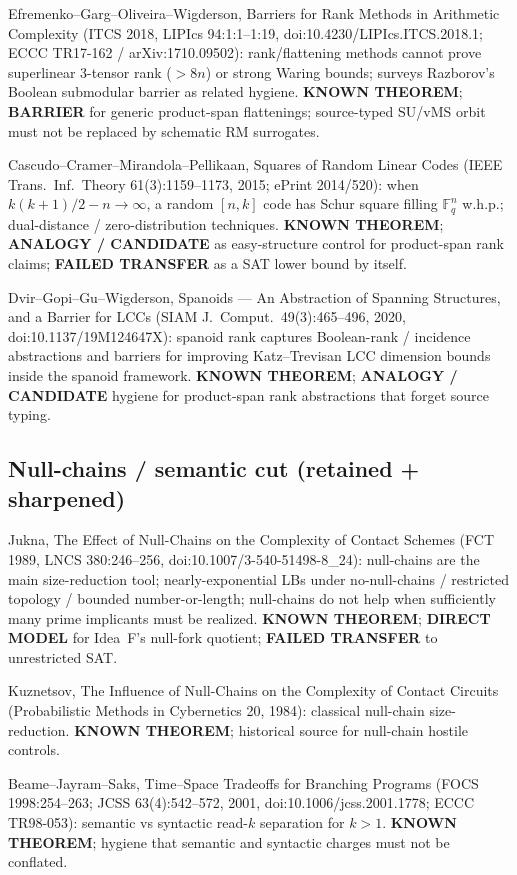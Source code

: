 \documentclass[11pt]{article}
\begin{document}
Efremenko--Garg--Oliveira--Wigderson, Barriers for Rank Methods in Arithmetic Complexity
(ITCS 2018, LIPIcs 94:1:1--1:19, doi:10.4230/LIPIcs.ITCS.2018.1; ECCC TR17-162 / arXiv:1710.09502):
rank/flattening methods cannot prove superlinear 3-tensor rank ($>8n$) or strong Waring
bounds; surveys Razborov's Boolean submodular barrier as related hygiene.
\textbf{KNOWN THEOREM}; \textbf{BARRIER} for generic product-span flattenings;
source-typed SU/vMS orbit must not be replaced by schematic RM surrogates.

Cascudo--Cramer--Mirandola--Pellikaan, Squares of Random Linear Codes
(IEEE Trans.\ Inf.\ Theory 61(3):1159--1173, 2015; ePrint 2014/520):
when $k(k+1)/2-n\to\infty$, a random $[n,k]$ code has Schur square filling $\mathbb F_q^n$
w.h.p.; dual-distance / zero-distribution techniques.
\textbf{KNOWN THEOREM}; \textbf{ANALOGY / CANDIDATE} as easy-structure control for
product-span rank claims; \textbf{FAILED TRANSFER} as a SAT lower bound by itself.

Dvir--Gopi--Gu--Wigderson, Spanoids --- An Abstraction of Spanning Structures, and a Barrier for LCCs
(SIAM J.\ Comput.\ 49(3):465--496, 2020, doi:10.1137/19M124647X):
spanoid rank captures Boolean-rank / incidence abstractions and barriers for improving
Katz--Trevisan LCC dimension bounds inside the spanoid framework.
\textbf{KNOWN THEOREM}; \textbf{ANALOGY / CANDIDATE} hygiene for product-span rank
abstractions that forget source typing.

\subsection*{Null-chains / semantic cut (retained + sharpened)}
Jukna, The Effect of Null-Chains on the Complexity of Contact Schemes
(FCT 1989, LNCS 380:246--256, doi:10.1007/3-540-51498-8\_24):
null-chains are the main size-reduction tool; nearly-exponential LBs under no-null-chains /
restricted topology / bounded number-or-length; null-chains do not help when sufficiently
many prime implicants must be realized.
\textbf{KNOWN THEOREM}; \textbf{DIRECT MODEL} for Idea~F's null-fork quotient;
\textbf{FAILED TRANSFER} to unrestricted SAT.

Kuznetsov, The Influence of Null-Chains on the Complexity of Contact Circuits
(Probabilistic Methods in Cybernetics 20, 1984): classical null-chain size-reduction.
\textbf{KNOWN THEOREM}; historical source for null-chain hostile controls.

Beame--Jayram--Saks, Time--Space Tradeoffs for Branching Programs
(FOCS 1998:254--263; JCSS 63(4):542--572, 2001, doi:10.1006/jcss.2001.1778; ECCC TR98-053):
semantic vs syntactic read-$k$ separation for $k>1$.
\textbf{KNOWN THEOREM}; hygiene that semantic and syntactic charges must not be conflated.
\end{document}
